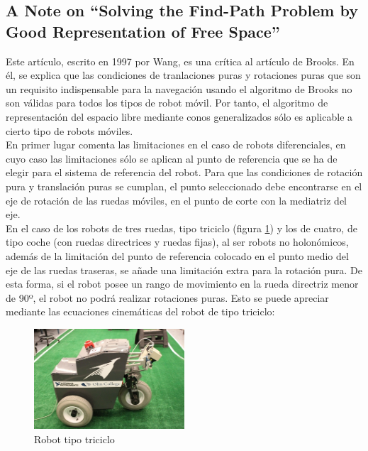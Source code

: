 \subsection{A Note on ``Solving the Find-Path Problem by Good Representation of Free Space''}

Este artículo, escrito en 1997 por Wang, es una crítica al artículo de Brooks. En él, se explica que las condiciones de tranlaciones puras y rotaciones puras que son un requisito indispensable para la navegación usando el algoritmo de Brooks no son válidas para todos los tipos de robot móvil. Por tanto, el algoritmo de representación del espacio libre mediante conos generalizados sólo es aplicable a cierto tipo de robots móviles.\\

En primer lugar comenta las limitaciones en el caso de robots diferenciales, en cuyo caso las limitaciones sólo se aplican al punto de referencia que se ha de elegir para el sistema de referencia del robot. Para que las condiciones de rotación pura y translación puras se cumplan, el punto seleccionado debe encontrarse en el eje de rotación de las ruedas móviles, en el punto de corte con la mediatriz del eje.\\


En el caso de los robots de tres ruedas, tipo triciclo (figura \ref{fig:triciclo}) y los de cuatro, de tipo coche (con ruedas directrices y ruedas fijas), al ser robots no holonómicos,  además de la limitación del punto de referencia colocado en el punto medio del eje de las ruedas traseras, se añade una limitación extra para la rotación pura. De esta forma, si el robot posee un rango de movimiento en la rueda directriz menor de 90º, el robot no podrá realizar rotaciones puras. Esto se puede apreciar mediante las ecuaciones cinemáticas del robot de tipo triciclo:

\begin{figure}[h]
		\centering
        \includegraphics[width=0.5\textwidth]{images/triciclo.jpg}
        \caption{Robot tipo triciclo}
        \label{fig:triciclo}
\end{figure} 

